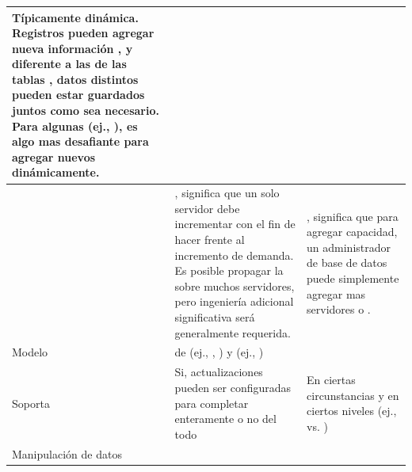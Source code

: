 \begin{table}[h!]
\begin{tabular}{ |L{0.1\paperwidth}|L{0.3\paperwidth}|L{0.3\paperwidth}|}
	Típicamente dinámica. Registros pueden agregar nueva información \onTheFly, y diferente a las \rowsDB de las tablas \sql, datos distintos pueden estar guardados juntos como sea necesario. Para algunas \dataBases (ej., \wideColumnDB \stores), es algo mas desafiante para agregar nuevos \fields dinámicamente.

\\ \hline
	\scaling&%
	
	\verticallyScale, significa que un solo servidor debe incrementar \powerful con el fin de hacer frente al incremento de demanda. Es posible propagar la \dataBase \sql sobre muchos servidores, pero ingeniería adicional significativa será generalmente requerida.&
	
	\horizontallyScale, significa que para agregar capacidad, un administrador de base de datos puede simplemente agregar mas servidores o \cloudInstances.
	
\\ \hline
	Modelo \development&
	
	\mix de \openSourcePC (ej., \postgresql, \mysql) y \closedSource (ej., \oracle \dataBase)&
	\openSourcePC
	
\\ \hline
	Soporta \transactionsDB&
	
	Si, actualizaciones pueden ser configuradas para completar enteramente o no del todo&	
	
	En ciertas circunstancias y en ciertos niveles (ej., \documentLevel vs. \dataBaseLevel)
	
\\ \hline
	Manipulación de datos&
	

\end{tabular}
\end{table}
